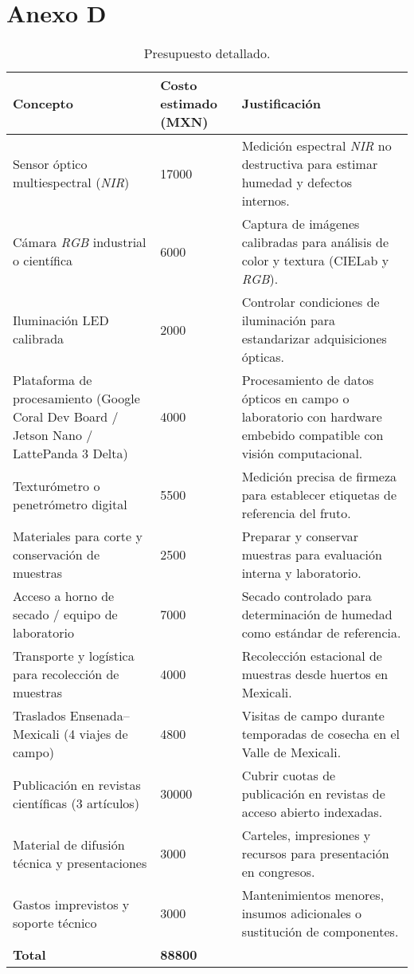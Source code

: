 \chapter*{Anexo D}
\label{AnexoD}

\begin{table}[h]
\centering
\footnotesize
\begin{tabular}{|p{5cm}|p{2cm}|p{6cm}|}
\hline
\textbf{Concepto} & \textbf{Costo estimado (MXN)} & \textbf{Justificación} \\
\hline
Sensor óptico multiespectral (\textit{NIR}) & 17000 & Medición espectral \textit{NIR} no destructiva para estimar humedad y defectos internos. \\
\hline
Cámara \textit{RGB} industrial o científica & 6000 & Captura de imágenes calibradas para análisis de color y textura (CIELab y \textit{RGB}). \\
\hline
Iluminación LED calibrada & 2000 & Controlar condiciones de iluminación para estandarizar adquisiciones ópticas. \\
\hline
Plataforma de procesamiento (Google Coral Dev Board / Jetson Nano / LattePanda 3 Delta) & 4000 & Procesamiento de datos ópticos en campo o laboratorio con hardware embebido compatible con visión computacional. \\
\hline
Texturómetro o penetrómetro digital & 5500 & Medición precisa de firmeza para establecer etiquetas de referencia del fruto. \\
\hline
Materiales para corte y conservación de muestras & 2500 & Preparar y conservar muestras para evaluación interna y laboratorio. \\
\hline
Acceso a horno de secado / equipo de laboratorio & 7000 & Secado controlado para determinación de humedad como estándar de referencia. \\
\hline
Transporte y logística para recolección de muestras & 4000 & Recolección estacional de muestras desde huertos en Mexicali. \\
\hline
Traslados Ensenada–Mexicali (4 viajes de campo) & 4800 & Visitas de campo durante temporadas de cosecha en el Valle de Mexicali. \\
\hline
Publicación en revistas científicas (3 artículos) & 30000 & Cubrir cuotas de publicación en revistas de acceso abierto indexadas. \\
\hline
Material de difusión técnica y presentaciones & 3000 & Carteles, impresiones y recursos para presentación en congresos. \\
\hline
Gastos imprevistos y soporte técnico & 3000 & Mantenimientos menores, insumos adicionales o sustitución de componentes. \\
\hline
\textbf{Total} & \textbf{88800} & \\
\hline
\end{tabular}
\caption{Presupuesto detallado.}
\label{tab:presupuesto}
\end{table}